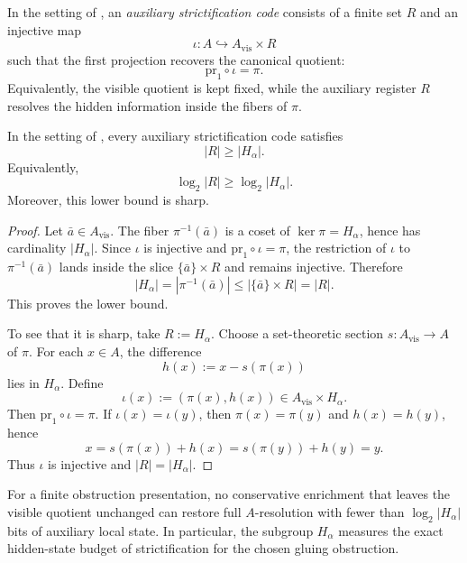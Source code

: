 \begin{definition}\label{def:auxiliary-strictification-code}
In the setting of , an \emph{auxiliary strictification code} consists of a finite set $R$ and an injective map
\[
\iota:A\hookrightarrow A_{\mathrm{vis}}\times R
\]
such that the first projection recovers the canonical quotient:
\[
\mathrm{pr}_1\circ\iota=\pi.
\]
Equivalently, the visible quotient is kept fixed, while the auxiliary register $R$ resolves the hidden information inside the fibers of $\pi$.
\end{definition}

\begin{proposition}\label{thm:minimal-information-cost-of-strictification}
In the setting of , every auxiliary strictification code satisfies
\[
|R|\ge |H_\alpha|.
\]
Equivalently,
\[
\log_2 |R|\ge \log_2 |H_\alpha|.
\]
Moreover, this lower bound is sharp.
\end{proposition}

\begin{proof}
Let $\bar a\in A_{\mathrm{vis}}$. The fiber $\pi^{-1}(\bar a)$ is a coset of $\ker\pi=H_\alpha$, hence has cardinality $|H_\alpha|$. Since $\iota$ is injective and $\mathrm{pr}_1\circ\iota=\pi$, the restriction of $\iota$ to $\pi^{-1}(\bar a)$ lands inside the slice $\{\bar a\}\times R$ and remains injective. Therefore
\[
|H_\alpha|=|\pi^{-1}(\bar a)|\le |\{\bar a\}\times R|=|R|.
\]
This proves the lower bound.

To see that it is sharp, take $R:=H_\alpha$. Choose a set-theoretic section $s:A_{\mathrm{vis}}\to A$ of $\pi$. For each $x\in A$, the difference
\[
h(x):=x-s(\pi(x))
\]
lies in $H_\alpha$. Define
\[
\iota(x):=(\pi(x),h(x))\in A_{\mathrm{vis}}\times H_\alpha.
\]
Then $\mathrm{pr}_1\circ\iota=\pi$. If $\iota(x)=\iota(y)$, then $\pi(x)=\pi(y)$ and $h(x)=h(y)$, hence
\[
x=s(\pi(x))+h(x)=s(\pi(y))+h(y)=y.
\]
Thus $\iota$ is injective and $|R|=|H_\alpha|$.
\end{proof}

\begin{corollary}\label{cor:conservative-recovery-budget}
For a finite obstruction presentation, no conservative enrichment that leaves the visible quotient unchanged can restore full $A$-resolution with fewer than $\log_2|H_\alpha|$ bits of auxiliary local state. In particular, the subgroup $H_\alpha$ measures the exact hidden-state budget of strictification for the chosen gluing obstruction.
\end{corollary}

